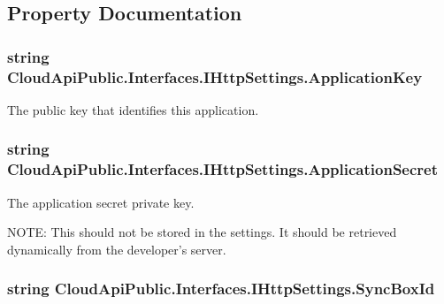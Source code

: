 \subsection{Property Documentation}
\hypertarget{interface_cloud_api_public_1_1_interfaces_1_1_i_http_settings_a9f4bbb5d5cf32d4748895959391f2489}{
\subsubsection[{Application\-Key}]{\setlength{\rightskip}{0pt plus 5cm}string Cloud\-Api\-Public.\-Interfaces.\-I\-Http\-Settings.\-Application\-Key\hspace{0.3cm}{\ttfamily [get]}}}\label{interface_cloud_api_public_1_1_interfaces_1_1_i_http_settings_a9f4bbb5d5cf32d4748895959391f2489}


The public key that identifies this application. 

\hypertarget{interface_cloud_api_public_1_1_interfaces_1_1_i_http_settings_abe14987cd96d35ec040ca3dff7bd9089}{
\subsubsection[{Application\-Secret}]{\setlength{\rightskip}{0pt plus 5cm}string Cloud\-Api\-Public.\-Interfaces.\-I\-Http\-Settings.\-Application\-Secret\hspace{0.3cm}{\ttfamily [get]}}}\label{interface_cloud_api_public_1_1_interfaces_1_1_i_http_settings_abe14987cd96d35ec040ca3dff7bd9089}


The application secret private key. 

N\-O\-T\-E\-: This should not be stored in the settings. It should be retrieved dynamically from the developer's server.\hypertarget{interface_cloud_api_public_1_1_interfaces_1_1_i_http_settings_ae02fbf7f1311292d14135095a63b398d}{
\subsubsection[{Sync\-Box\-Id}]{\setlength{\rightskip}{0pt plus 5cm}string Cloud\-Api\-Public.\-Interfaces.\-I\-Http\-Settings.\-Sync\-Box\-Id\hspace{0.3cm}{\ttfamily [get]}}}\label{interface_cloud_api_public_1_1_interfaces_1_1_i_http_settings_ae02fbf7f1311292d14135095a63b398d}


